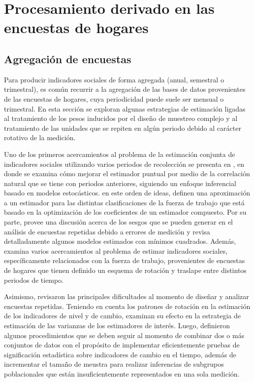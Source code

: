 \documentclass[
  10pt,
  spanish,
]{book}
\begin{document}
\hypertarget{part-procesamiento-derivado-en-las-encuestas-de-hogares}{%
\part{Procesamiento derivado en las encuestas de hogares}\label{part-procesamiento-derivado-en-las-encuestas-de-hogares}}

\hypertarget{agregaciuxf3n-de-encuestas}{%
\chapter{Agregación de encuestas}\label{agregaciuxf3n-de-encuestas}}

Para producir indicadores sociales de forma agregada (anual, semestral o
trimestral), es común recurrir a la agregación de las bases de datos
provenientes de las encuestas de hogares, cuya periodicidad puede suele
ser mensual o trimestral. En esta sección se exploran algunas
estrategias de estimación ligadas al tratamiento de los pesos inducidos
por el diseño de muestreo complejo y al tratamiento de las unidades que
se repiten en algún periodo debido al carácter rotativo de la medición.

Uno de los primeros acercamientos al problema de la estimación conjunta
de indicadores sociales utilizando varios periodos de recolección se
presenta en \citet{Gurney_Daly_1965}, en donde se examina cómo mejorar el
estimador puntual por medio de la correlación natural que se tiene con
periodos anteriores, siguiendo un enfoque inferencial basado en modelos
estocásticos. en este orden de ideas, \citet{Lent_Miller_Duff_1999} definen una
aproximación a un estimador para las distintas clasificaciones de la
fuerza de trabajo que está basado en la optimización de los coeficientes
de un estimador compuesto. Por su parte, \citet{Fuller_1990} provee una
discusión acerca de los sesgos que se pueden generar en el análisis de
encuestas repetidas debido a errores de medición y revisa detalladamente
algunos modelos estimados con mínimos cuadrados. Además, \citet{Bell_2001}
examina varios acercamientos al problema de estimar indicadores
sociales, específicamente relacionados con la fuerza de trabajo,
provenientes de encuestas de hogares que tienen definido un esquema de
rotación y traslape entre distintos periodos de tiempo.

Asimismo, \citet{Steel_McLaren_2008} revisaron las principales dificultades al
momento de diseñar y analizar encuestas repetidas. Teniendo en cuenta
los patrones de rotación en la estimación de los indicadores de nivel y
de cambio, examinan su efecto en la estrategia de estimación de las
varianzas de los estimadores de interés. Luego, \citet{Lewis_2017} definieron
algunos procedimientos que se deben seguir al momento de combinar dos o
más conjuntos de datos con el propósito de implementar eficientemente
pruebas de significación estadística sobre indicadores de cambio en el
tiempo, además de incrementar el tamaño de meustra para realizar
inferencias de subgrupos poblacionales que están insuficientemente
representados en una sola medición.
\end{document}

